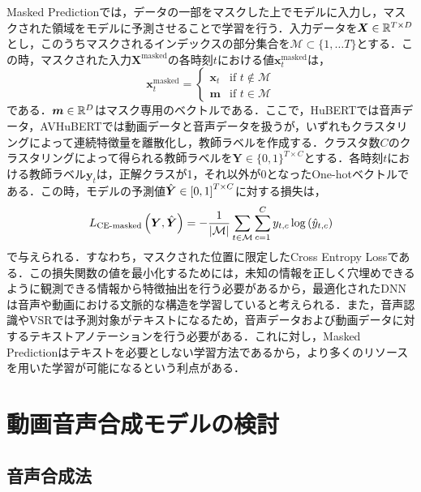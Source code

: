 \documentclass[12pt]{jarticle}
\numberwithin{equation}{section}    %
\numberwithin{figure}{section}      %
\numberwithin{table}{section}      %
\begin{document}
Masked Predictionでは，データの一部をマスクした上でモデルに入力し，マスクされた領域をモデルに予測させることで学習を行う．入力データを$\bm{X} \in \mathbb{R}^{T \times D}$とし，このうちマスクされるインデックスの部分集合を$\mathcal{M} \subset \{ 1, \ldots T \}$とする．この時，マスクされた入力$\bm{X}^{\text{masked}}$の各時刻$t$における値$\bm{x}^{\text{masked}}_{t}$は，
\begin{equation}
    \bm{x}^{\text{masked}}_{t} =
    \begin{cases}
        \bm{x}_{t} & \text{if $t \notin \mathcal{M}$} \\
        \bm{m}     & \text{if $t \in \mathcal{M}$}
    \end{cases}
\end{equation}
である．$\bm{m} \in \mathbb{R}^{D}$はマスク専用のベクトルである．ここで，HuBERTでは音声データ，AVHuBERTでは動画データと音声データを扱うが，いずれもクラスタリングによって連続特徴量を離散化し，教師ラベルを作成する．クラスタ数$C$のクラスタリングによって得られる教師ラベルを$\bm{Y} \in \{0, 1\}^{T \times C}$とする．各時刻$t$における教師ラベル$\bm{y}_{t}$は，正解クラスが1，それ以外が0となったOne-hotベクトルである．この時，モデルの予測値$\hat{\bm{Y}} \in \left[0, 1\right]^{T \times C}$に対する損失は，
\begin{equation}
    L_{\text{CE-masked}}\left(\bm{Y}, \hat{\bm{Y}}\right) =
    - \frac{1}{|\mathcal{M}|} \sum_{t \in \mathcal{M}} \sum_{c = 1}^{C} y_{t, c} \log \left(\hat{y}_{t, c}\right)
\end{equation}
で与えられる．すなわち，マスクされた位置に限定したCross Entropy Lossである．この損失関数の値を最小化するためには，未知の情報を正しく穴埋めできるように観測できる情報から特徴抽出を行う必要があるから，最適化されたDNNは音声や動画における文脈的な構造を学習していると考えられる．また，音声認識やVSRでは予測対象がテキストになるため，音声データおよび動画データに対するテキストアノテーションを行う必要がある．これに対し，Masked Predictionはテキストを必要としない学習方法であるから，より多くのリソースを用いた学習が可能になるという利点がある．

\clearpage

\section{動画音声合成モデルの検討}
\subsection{音声合成法}
\end{document}
